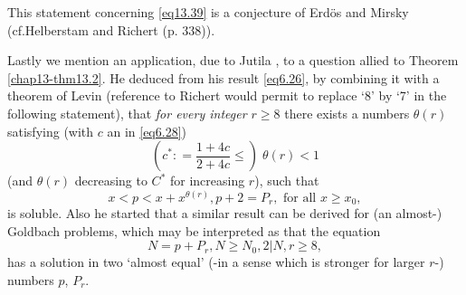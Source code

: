 This statement concerning \eqref{eq13.39} is a conjecture of Erd\"{o}s and\break
Mirsky \cite{key1} (cf.\pageoriginale Helberstam and Richert
\cite{key1} (p. 338)). 

Lastly we mention an application, due to Jutila \cite{key1}, to a question
allied to Theorem \ref{chap13-thm13.2}. He deduced from his result
\eqref{eq6.26}, by 
combining it with a theorem of Levin \cite{key2} (reference to Richert
\cite{key1} would permit to replace `8' by `7' in the following statement),
that  \textit{for every integer $r \ge 8$} there exists a numbers
$\theta (r)$ satisfying (with $c$ an in \eqref{eq6.28})  
\begin{equation*}
(c^* : = \frac{1+4c}{2+4c} \le) \; \theta(r) <
  1\tag{13.40}\label{eq13.40} 
\end{equation*}
(and $\theta(r)$ decreasing to $C^*$ for increasing $r$), such that 
\begin{equation*}
x < p < x+x^{\theta (r)}, p+2=P_r, \text{ for all } x \ge
x_0,\tag{13.41}\label{eq13.41} 
\end{equation*} 
is soluble. Also he started that a similar result can be derived for
(an almost-) Goldbach problems, which may be interpreted as that the
equation 
\begin{equation*}
N=p+P_r, N \ge N_0, 2|N, r \ge 8,\tag{13.42}\label{eq13.42}
\end{equation*}  
has a solution in two `almost equal' (-in a sense which is stronger
for larger $r$-) numbers $p$, $P_r$. 


